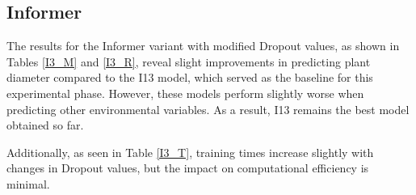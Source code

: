 \subsection{Informer}
The results for the Informer variant with modified Dropout values, as shown in Tables \ref{I3_M} and \ref{I3_R}, reveal slight improvements in predicting plant diameter compared to the I13 model, which served as the baseline for this experimental phase. However, these models perform slightly worse when predicting other environmental variables. As a result, I13 remains the best model obtained so far.

Additionally, as seen in Table \ref{I3_T}, training times increase slightly with changes in Dropout values, but the impact on computational efficiency is minimal.


\begin{table}[]
    \centering
    \caption{Mean Squared Errors (MSE) for different Informer models obtained by varying the Dropout, sorted by model}
    \label{I3_M}
    \end{table}

